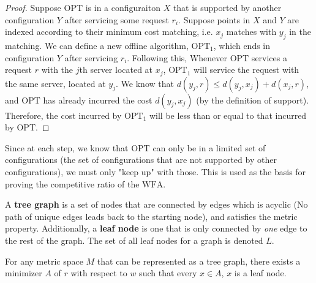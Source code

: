 \begin{proof}
    Suppose $\mathrm{OPT}$ is in a configuraiton $X$ that is supported by another configuration $Y$ after servicing some request $r_i$. Suppose points in $X$ and $Y$ are indexed according to their minimum cost matching, i.e. $x_j$ matches with $y_j$ in the matching. We can define a new offline algorithm, $\mathrm{OPT}_1$, which ends in configuration $Y$ after servicing $r_i$. Following this, Whenever $\mathrm{OPT}$ services a request $r$ with the $j$th server located at $x_j$, $\mathrm{OPT}_1$ will service the request with the same server, located at $y_j$. We know that $d(y_j, r) \leq d(y_j, x_j) + d(x_j, r)$, and $\mathrm{OPT}$ has already incurred the cost $d(y_j, x_j)$ (by the definition of support). Therefore, the cost incurred by $\mathrm{OPT}_1$ will be less than or equal to that incurred by $\mathrm{OPT}$.
\end{proof}

Since at each step, we know that $\mathrm{OPT}$ can only be in a limited set of configurations (the set of configurations that are not supported by other configurations), we must only "keep up" with those. This is used as the basis for proving the competitive ratio of the $\mathrm{WFA}$.

\begin{definition}
    A \textbf{tree graph} is a set of nodes that are connected by edges which is acyclic (No path of unique edges leads back to the starting node), and satisfies the metric property. Additionally, a \textbf{leaf node} is one that is only connected by \textit{one} edge to the rest of the graph. The set of all leaf nodes for a graph is denoted $L$.
\end{definition}

\begin{lemma}
    \label{lem:leaf}
    For any metric space $M$ that can be represented as a tree graph, there exists a minimizer $A$ of $r$ with respect to $w$ such that every $x \in A$, $x$ is a leaf node.
\end{lemma}

